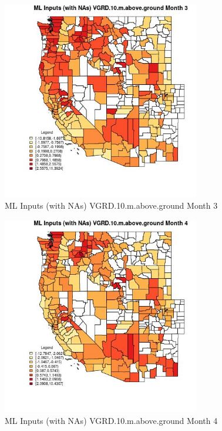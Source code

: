 \begin{figure} 
\centering  
\includegraphics[width=0.77\textwidth]{Code_Outputs/Report_ML_input_PM25_Step4_part_e_de_duplicated_aves_compiled_2019-05-21wNAs_CountyVGRD10mabovegroundmedianMonth3.jpg} 
\caption{\label{fig:Report_ML_input_PM25_Step4_part_e_de_duplicated_aves_compiled_2019-05-21wNAsCountyVGRD10mabovegroundmedianMonth3}ML Inputs (with NAs) VGRD.10.m.above.ground Month 3} 
\end{figure} 
 

\begin{figure} 
\centering  
\includegraphics[width=0.77\textwidth]{Code_Outputs/Report_ML_input_PM25_Step4_part_e_de_duplicated_aves_compiled_2019-05-21wNAs_CountyVGRD10mabovegroundmedianMonth4.jpg} 
\caption{\label{fig:Report_ML_input_PM25_Step4_part_e_de_duplicated_aves_compiled_2019-05-21wNAsCountyVGRD10mabovegroundmedianMonth4}ML Inputs (with NAs) VGRD.10.m.above.ground Month 4} 
\end{figure} 
 

